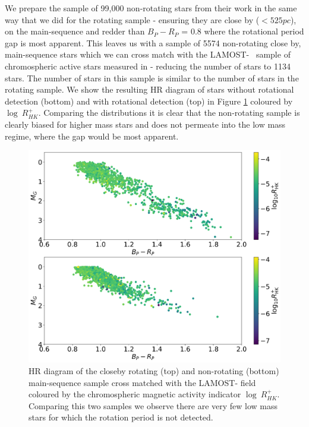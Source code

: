 We prepare the sample of 99,000 non-rotating stars from their work in the same way that we did for the rotating sample - ensuring they are close by ($<525 pc$), on the main-sequence and redder than $B_P-R_P$  = 0.8 where the rotational period gap is most apparent.
This leaves us with a sample of 5574 non-rotating close by, main-sequence stars which we can cross match with the LAMOST-\kepler{} \ sample of chromospheric active stars measured in \citet{zhang_magnetic_2020} - reducing the number of stars to 1134 stars.
The number of stars in this sample is similar to the number of stars in the rotating sample.
We show the resulting HR diagram of stars without rotational detection (bottom) and with rotational detection (top) in Figure \ref{fig:non_rotating_mag_hr} coloured by $\log \ R^{+}_{HK}$.
Comparing the distributions it is clear that the non-rotating sample is clearly biased for higher mass stars and does not permeate into the low mass regime, where the gap would be most apparent.


\begin{figure}
\centering
    \includegraphics[width=\textwidth]{Figures/rot_gap_figures/HR_mag_and_non_rot.png}
    \caption{
    HR diagram of the closeby rotating (top) and non-rotating (bottom) main-sequence sample cross matched with the LAMOST-\kepler{} field coloured by the chromospheric magnetic activity indicator $\log \ R^{+}_{HK}$.
    Comparing this two samples we observe there are very few low mass stars for which the rotation period is not detected.}
    \label{fig:non_rotating_mag_hr}
\end{figure}


